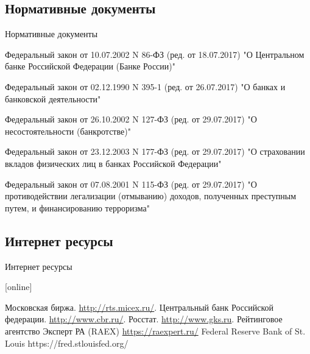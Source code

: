 \documentclass[_Banking_p1.tex]{subfiles}
\begin{document}
\subsection*{Нормативные документы}

\begin{frame}[allowframebreaks]{Нормативные документы}
  \begin{thebibliography}{10}
  
  \beamertemplatearticlebibitems

Федеральный закон от 10.07.2002 N 86-ФЗ (ред. от 18.07.2017) "О Центральном банке Российской Федерации (Банке России)"

Федеральный закон от 02.12.1990 N 395-1 (ред. от 26.07.2017) "О банках и банковской деятельности"

Федеральный закон от 26.10.2002 N 127-ФЗ (ред. от 29.07.2017) "О несостоятельности (банкротстве)"

\pagebreak
Федеральный закон от 23.12.2003 N 177-ФЗ (ред. от 29.07.2017) "О страховании вкладов физических лиц в банках Российской Федерации"

Федеральный закон от 07.08.2001 N 115-ФЗ (ред. от 29.07.2017) "О противодействии легализации (отмыванию) доходов, полученных преступным путем, и финансированию терроризма"

  \end{thebibliography}
\end{frame}

\subsection*{Интернет ресурсы}
\begin{frame}[allowframebreaks]{Интернет ресурсы}
    
  \begin{thebibliography}{10}
  
  [online]

    Московская биржа.
    \newblock \url{http://rts.micex.ru/}.
    Центральный банк Российской федерации.
    \newblock \url{http://www.cbr.ru/}.
    Росстат.
    \newblock \url{http://www.gks.ru}.
   Рейтинговое агентство Эксперт РА (RAEX)
    \newblock \url{https://raexpert.ru/}
 	Federal Reserve Bank of St. Louis
	\newblock https://fred.stlouisfed.org/    
  \end{thebibliography}
\end{frame}
\end{document}
